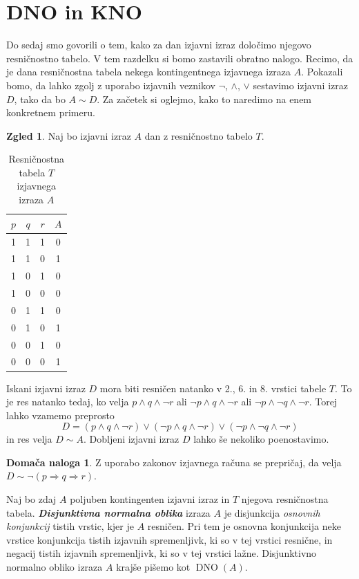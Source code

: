 \documentclass[11pt]{book}
\DeclareMathOperator\DNO{DNO}
\def\definicija{\color{rdeca}\bf\em}
\theoremstyle{definition}
\theoremstyle{zgled}
\newtheorem*{zgled}{Zgled}
\theoremstyle{odprtproblem}
\theoremstyle{domacanaloga}
\newtheorem*{domacanaloga}{Domača naloga}
\theoremstyle{izrek}
\begin{document}
\section{DNO in KNO}

Do sedaj smo govorili o tem, kako za dan izjavni izraz določimo njegovo resničnostno tabelo. V tem razdelku si bomo zastavili obratno nalogo. Recimo, da je dana resničnostna tabela nekega kontingentnega izjavnega izraza $A$. Pokazali bomo, da lahko zgolj z uporabo izjavnih veznikov $\lnot$, $\land$, $\lor$ sestavimo izjavni izraz $D$, tako da bo $A \sim D$. Za začetek si oglejmo, kako to naredimo na enem konkretnem primeru.

\begin{zgled}
Naj bo izjavni izraz $A$ dan z resničnostno tabelo $T$.

\begin{table}[h]
    \centering
    \begin{tabular}{ccc|c}
        $p$ & $q$ & $r$ & $A$ \\ \hline
        1 & 1 & 1 & 0 \\
        1 & 1 & 0 & 1 \\
        1 & 0 & 1 & 0 \\
        1 & 0 & 0 & 0 \\
        0 & 1 & 1 & 0 \\
        0 & 1 & 0 & 1 \\
        0 & 0 & 1 & 0 \\
        0 & 0 & 0 & 1
    \end{tabular}
    \caption{Resničnostna tabela $T$ izjavnega izraza $A$}
\end{table}

Iskani izjavni izraz $D$ mora biti resničen natanko v 2., 6. in 8. vrstici tabele $T$. To je res natanko tedaj, ko velja $p \land q \land \lnot r$ ali $\lnot p \land q \land \lnot r$ ali $\lnot p \land \lnot q \land \lnot r$. Torej lahko vzamemo preprosto
\[
    D = (p \land q \land \lnot r) \lor (\lnot p \land q \land \lnot r) \lor (\lnot p \land \lnot q \land \lnot r)
\]
in res velja $D \sim A$. Dobljeni izjavni izraz $D$ lahko še nekoliko poenostavimo. 

\begin{domacanaloga}
    Z uporabo zakonov izjavnega računa se prepričaj, da velja $D \sim \lnot (p \Rightarrow q \Rightarrow r)$.
\end{domacanaloga}
\end{zgled}

Naj bo zdaj $A$ poljuben kontingenten izjavni izraz in $T$ njegova resničnostna tabela. {\definicija Disjunktivna normalna oblika} izraza $A$ je disjunkcija \emph{osnovnih konjunkcij} tistih vrstic, kjer je $A$ resničen. Pri tem je osnovna konjunkcija neke vrstice konjunkcija tistih izjavnih spremenljivk, ki so v tej vrstici resnične, in negacij tistih izjavnih spremenljivk, ki so v tej vrstici lažne. Disjunktivno normalno obliko izraza $A$ krajše pišemo kot $\DNO(A)$.
\end{document}
